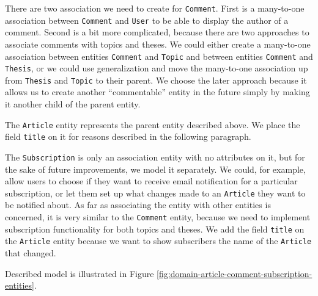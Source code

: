 There are two association we need to create for \texttt{Comment}. First is a many-to-one association between \texttt{Comment} and \texttt{User} to be able to display the author of a comment. Second is a bit more complicated, because there are two approaches to associate comments with topics and theses. We could either create a many-to-one association between entities \texttt{Comment} and \texttt{Topic} and between entities \texttt{Comment} and \texttt{Thesis}, or we could use generalization and move the many-to-one association up from \texttt{Thesis} and \texttt{Topic} to their parent. We choose the later approach because it allows us to create another ``commentable'' entity in the future simply by making it another child of the parent entity.

The \texttt{Article} entity represents the parent entity described above. We place the field \texttt{title} on it for reasons described in the following paragraph.

The \texttt{Subscription} is only an association entity with no attributes on it, but for the sake of future improvements, we model it separately. We could, for example, allow users to choose if they want to receive email notification for a particular subscription, or let them set up what changes made to an \texttt{Article} they want to be notified about. As far as associating the entity with other entities is concerned, it is very similar to the \texttt{Comment} entity, because we need to implement subscription functionality for both topics and theses. We add the field \texttt{title} on the \texttt{Article} entity because we want to show subscribers the name of the \texttt{Article} that changed.

Described model is illustrated in Figure \ref{fig:domain-article-comment-subscription-entities}.

